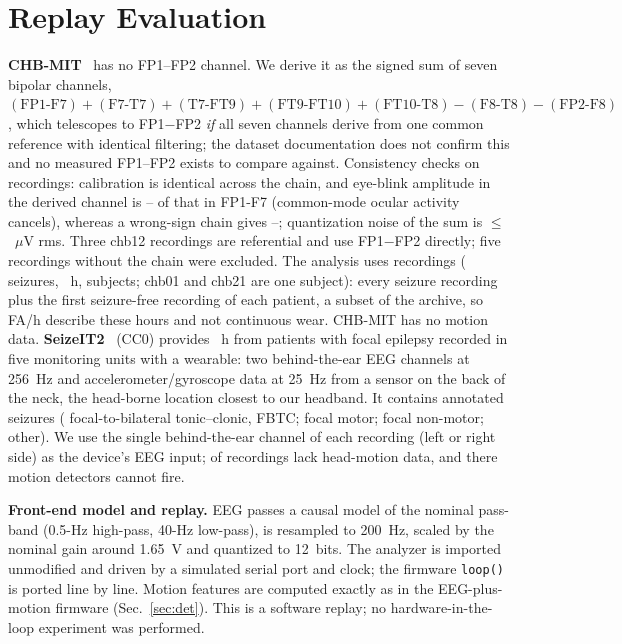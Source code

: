 \documentclass[conference,letterpaper]{IEEEtran}
\begin{document}
\section{Replay Evaluation}\label{sec:method}
\textbf{CHB-MIT}~\cite{shoeb2009thesis,goldberger2000physionet} has no FP1--FP2 channel. We derive it as the signed sum of seven bipolar channels, $(\text{FP1-F7})+(\text{F7-T7})+(\text{T7-FT9})+(\text{FT9-FT10})+(\text{FT10-T8})-(\text{F8-T8})-(\text{FP2-F8})$, which telescopes to FP1$-$FP2 \emph{if} all seven channels derive from one common reference with identical filtering; the dataset documentation does not confirm this and no measured FP1--FP2 exists to compare against. Consistency checks on \RcFiles{} recordings: calibration is identical across the chain, and eye-blink amplitude in the derived channel is \RcBlinkLo--\RcBlinkHi{} of that in FP1-F7 (common-mode ocular activity cancels), whereas a wrong-sign chain gives \RcWrongLo--\RcWrongHi; quantization noise of the sum is $\le$\RcQuantHi{}~$\mu$V rms. Three chb12 recordings are referential and use FP1$-$FP2 directly; five recordings without the chain were excluded. The analysis uses \NRec{} recordings (\NSz{} seizures, \NHours{}~h, \NSubj{} subjects; chb01 and chb21 are one subject): every seizure recording plus the first seizure-free recording of each patient, a subset of the archive, so FA/h describe these hours and not continuous wear. CHB-MIT has no motion data.
\textbf{SeizeIT2}~\cite{bhagubai2025seizeit2} (CC0) provides \SHours{}~h from \SNSubj{} patients with focal epilepsy recorded in five monitoring units with a wearable: two behind-the-ear EEG channels at 256~Hz and accelerometer/gyroscope data at 25~Hz from a sensor on the back of the neck, the head-borne location closest to our headband. It contains \SNSz{} annotated seizures (\SNFBTC{} focal-to-bilateral tonic--clonic, FBTC; \SNMotor{} focal motor; \SNNonMotor{} focal non-motor; \SNOther{} other). We use the single behind-the-ear channel of each recording (left or right side) as the device's EEG input; \SMovMissing{} of \SNRuns{} recordings lack head-motion data, and there motion detectors cannot fire.

\textbf{Front-end model and replay.} EEG passes a causal model of the nominal pass-band (0.5-Hz high-pass, 40-Hz low-pass), is resampled to 200~Hz, scaled by the nominal gain around 1.65~V and quantized to 12~bits. The analyzer is imported unmodified and driven by a simulated serial port and clock; the firmware \texttt{loop()} is ported line by line. Motion features are computed exactly as in the EEG-plus-motion firmware (Sec.~\ref{sec:det}). This is a software replay; no hardware-in-the-loop experiment was performed.
\end{document}
